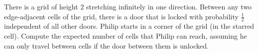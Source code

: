 There is a grid of height $2$ stretching infinitely in one direction. Between any two edge-adjacent cells of the grid, there is a door that is locked with probability $\frac{1}{2}$ independent of all other doors. Philip starts in a corner of the grid (in the starred cell). Compute the expected number of cells that Philip can reach, assuming he can only travel between cells if the door between them is unlocked.